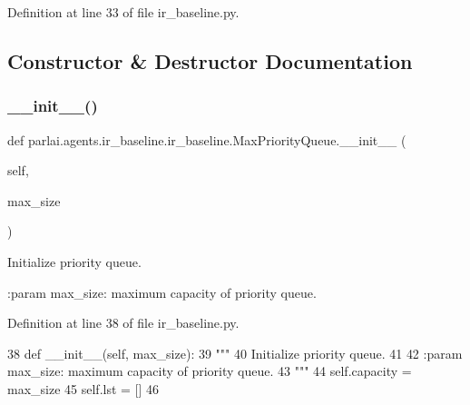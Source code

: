 Definition at line 33 of file ir\+\_\+baseline.\+py.



\subsection{Constructor \& Destructor Documentation}
\mbox{\label{classparlai_1_1agents_1_1ir__baseline_1_1ir__baseline_1_1MaxPriorityQueue_a33145693ab371c9f96cb8339fd4a39c3}} 
\subsubsection{\texorpdfstring{\+\_\+\+\_\+init\+\_\+\+\_\+()}{\_\_init\_\_()}}
{\footnotesize\ttfamily def parlai.\+agents.\+ir\+\_\+baseline.\+ir\+\_\+baseline.\+Max\+Priority\+Queue.\+\_\+\+\_\+init\+\_\+\+\_\+ (\begin{DoxyParamCaption}\item[{}]{self,  }\item[{}]{max\+\_\+size }\end{DoxyParamCaption})}

\begin{DoxyVerb}Initialize priority queue.

:param max_size: maximum capacity of priority queue.
\end{DoxyVerb}
 

Definition at line 38 of file ir\+\_\+baseline.\+py.


\begin{DoxyCode}
38     \textcolor{keyword}{def }\_\_init\_\_(self, max\_size):
39         \textcolor{stringliteral}{"""}
40 \textcolor{stringliteral}{        Initialize priority queue.}
41 \textcolor{stringliteral}{}
42 \textcolor{stringliteral}{        :param max\_size: maximum capacity of priority queue.}
43 \textcolor{stringliteral}{        """}
44         self.capacity = max\_size
45         self.lst = []
46 
\end{DoxyCode}



